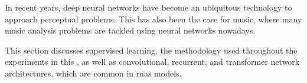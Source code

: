 

In recent years, deep neural networks have become an
ubiquitous technology to approach perceptual problems. This
has also been the case for music, where many music analysis
problems are tackled using neural networks nowadays.

This section discusses supervised learning, the methodology
used throughout the experiments in this \thesisdiss, as well
as convolutional, recurrent, and transformer network
architectures, which are common in \glspl{rna} models.
